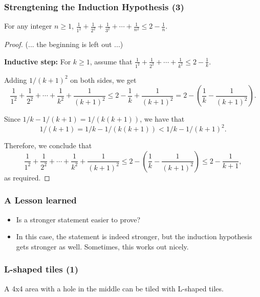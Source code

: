 \begin{frame}\frametitle{Strengtening the Induction Hypothesis (3)}
  \begin{theorem}
    For any integer $n\geq 1$, $\frac{1}{1^2} + \frac{1}{2^2} + \frac{1}{3^2} + \cdots +\frac{1}{n^2} \leq 2 - \frac{1}{n}$.
  \end{theorem}
  \pause
  \begin{proof}
    {\footnotesize
      (... the beginning is left out ...)
      
      {\bf Inductive step:} For $k\geq 1$, assume that $ \frac{1}{1^2} + \frac{1}{2^2}  + \cdots +\frac{1}{k^2} \leq 2 - \frac{1}{k}. $

      \pause      
      Adding $1/(k+1)^2$ on both sides, we get
      \[ \frac{1}{1^2} + \frac{1}{2^2}  + \cdots +\frac{1}{k^2}+\frac{1}{(k+1)^2}
      \leq 2 - \frac{1}{k} +\frac{1}{(k+1)^2}
      = 2 - \left(\frac{1}{k} - \frac{1}{(k+1)^2}\right).\]

      \pause      
      Since $1/k - 1/(k+1) = 1/(k(k+1))$, we have that
      \[1/(k+1) = 1/k - 1/(k(k+1)) < 1/k - 1/(k+1)^2.\]

      \pause      
      Therefore, we conclude that
      \[
      \frac{1}{1^2} + \frac{1}{2^2} + \cdots +\frac{1}{k^2}+\frac{1}{(k+1)^2}
      \leq 2 - \left(\frac{1}{k} - \frac{1}{(k+1)^2}\right)
      \leq 2 - \frac{1}{k+1},
      \]
      as required.
    }
  \end{proof}
\end{frame}

\begin{frame}\frametitle{A Lesson learned}
  \begin{itemize}
  \item
    Is a stronger statement easier to prove?
    \pause
  \item
    In this case, the statement is indeed stronger, but the induction
    hypothesis gets stronger as well.  Sometimes, this works out
    nicely.
  \end{itemize}
\end{frame}

\begin{frame}\frametitle{L-shaped tiles (1)}
  A 4x4 area with a hole in the middle can be tiled with L-shaped tiles.

  \vspace{0.2in}
  
\end{frame}

